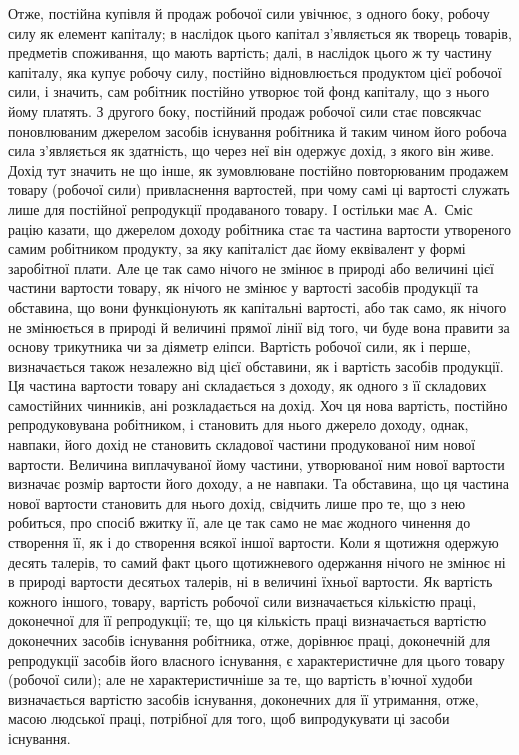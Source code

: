 Отже, постійна купівля й продаж робочої сили увічнює, з одного
боку, робочу силу як елемент капіталу; в наслідок цього капітал з’являється
як творець товарів, предметів споживання, що мають вартість;
далі, в наслідок цього ж ту частину капіталу, яка купує робочу силу, постійно
відновлюється продуктом цієї робочої сили, і значить, сам робітник постійно
утворює той фонд капіталу, що з нього йому платять. З другого
боку, постійний продаж робочої сили стає повсякчас поновлюваним джерелом
засобів існування робітника й таким чином його робоча сила
з’являється як здатність, що через неї він одержує дохід, з якого він
живе. Дохід тут значить не що інше, як зумовлюване постійно повторюваним
продажем товару (робочої сили) привласнення вартостей, при
чому самі ці вартості служать лише для постійної репродукції продаваного
товару. І остільки має А.~Сміс рацію казати, що джерелом доходу
робітника стає та частина вартости утвореного самим робітником продукту, за
яку капіталіст дає йому еквівалент у формі заробітної плати. Але це так
само нічого не змінює в природі або величині цієї частини вартости товару,
як нічого не змінює у вартості засобів продукції та обставина, що
вони функціонують як капітальні вартості, або так само, як нічого не
змінюється в природі й величині прямої лінії від того, чи буде вона правити
за основу трикутника чи за діяметр еліпси. Вартість робочої сили,
як і перше, визначається також незалежно від цієї обставини, як і вартість
засобів продукції. Ця частина вартости товару ані складається з доходу,
як одного з її складових самостійних чинників, ані розкладається на
дохід. Хоч ця нова вартість, постійно репродуковувана робітником, і становить
для нього джерело доходу, однак, навпаки, його дохід не становить
складової частини продукованої ним нової вартости. Величина виплачуваної
йому частини, утворюваної ним нової вартости визначає розмір
вартости його доходу, а не навпаки. Та обставина, що ця частина нової
вартости становить для нього дохід, свідчить лише про те, що з нею робиться,
про спосіб вжитку її, але це так само не має жодного чинення до створення
її, як і до створення всякої іншої вартости. Коли я щотижня
одержую десять талерів, то самий факт цього щотижневого одержання
нічого не змінює ні в природі вартости десятьох талерів, ні в величині
їхньої вартости. Як вартість кожного іншого, товару, вартість робочої
сили визначається кількістю праці, доконечної для її репродукції; те, що
ця кількість праці визначається вартістю доконечних засобів існування
робітника, отже, дорівнює праці, доконечній для репродукції засобів його
власного існування, є характеристичне для цього товару (робочої сили);
але не характеристичніше за те, що вартість в’ючної худоби визначається
вартістю засобів існування, доконечних для її утримання, отже,
масою людської праці, потрібної для того, щоб випродукувати ці засоби
існування.

